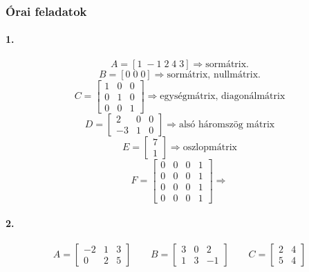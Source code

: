 \documentclass[12pt,a4paper,fleqn]{article}
\newcommand{\myparagraph}[1]{\paragraph{#1}\mbox{}}
\begin{document}
\subsubsection{Órai feladatok}

\myparagraph{1.}
\[
  A = \left[1\;-1\;2\;4\;3\right] \Rightarrow \text{sormátrix.}
\]
\[
  B = \left[0\;0\;0\right] \Rightarrow \text{sormátrix, nullmátrix.}
\]
\[
  C = \begin{bmatrix} 1 & 0 & 0 \\ 0 & 1 & 0 \\ 0 & 0 & 1 \end{bmatrix}
    \Rightarrow \text{egységmátrix, diagonálmátrix}
\]
\[
  D = \begin{bmatrix} 2 & 0 & 0 \\ -3 & 1 & 0 \end{bmatrix}
    \Rightarrow \text{alsó háromszög mátrix}
\]
\[
  E = \begin{bmatrix} 7 \\ 1 \end{bmatrix} \Rightarrow \text{oszlopmátrix}
\]
\[
  F = \begin{bmatrix} 0 & 0 & 0 & 1 \\ 0 & 0 & 0 & 1 \\ 0 & 0 & 0 & 1
    \\ 0 & 0 & 0 & 1 \end{bmatrix} \Rightarrow \text{} %
\]

\myparagraph{2.}
\[
  A = \begin{bmatrix} -2 & 1 & 3 \\ 0 & 2 & 5 \end{bmatrix} \qquad
  B = \begin{bmatrix} 3 & 0 & 2 \\ 1 & 3 & -1 \end{bmatrix} \qquad
  C = \begin{bmatrix} 2 & 4 \\ 5 & 4 \end{bmatrix}
\]
\end{document}
